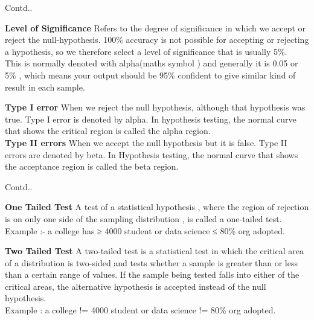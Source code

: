 \documentclass{beamer}
\begin{document}
\begin{frame}{Contd..}
	\begin{flushleft}
	\textbf{Level of Significance}
	Refers to the degree of significance in which we accept or reject the null-hypothesis. 100\% accuracy is not possible for accepting or rejecting a hypothesis, so we therefore select a level of significance that is usually 5\%.
\\
\vspace{10pt}
				This is normally denoted with alpha(maths symbol ) and generally it is 0.05 or 5\% , which means your output should be 95\% confident to give similar kind of result in each sample.
	\\
\vspace{10pt}			

\textbf{Type I error}
	When we reject the null hypothesis, although that hypothesis was true. Type I error is denoted by alpha. In hypothesis testing, the normal curve that shows the critical region is called the alpha region.
\\
\vspace{10pt}
\textbf{Type II errors}
				When we accept the null hypothesis but it is false. Type II errors are denoted by beta. In Hypothesis testing, the normal curve that shows the acceptance region is called the beta region.

	\end{flushleft}
\end{frame}

\begin{frame}{Contd..}
\begin{flushleft}
	\textbf{One Tailed Test}
A test of a statistical hypothesis , where the region of rejection is on only one side of the sampling distribution , is called a one-tailed test.
\\
\vspace{10pt}
Example :- a college has ≥ 4000 student or data science ≤ 80\% org adopted.
\\
\vspace{10pt}

\textbf{Two Tailed Test}
				A two-tailed test is a statistical test in which the critical area of a distribution is two-sided and tests whether a sample is greater than or less than a certain range of values. If the sample being tested falls into either of the critical areas, the alternative hypothesis is accepted instead of the null hypothesis.
\\
\vspace{10pt}
	Example : a college != 4000 student or data science != 80\% org adopted.
\end{flushleft}
\end{frame}
\end{document}

